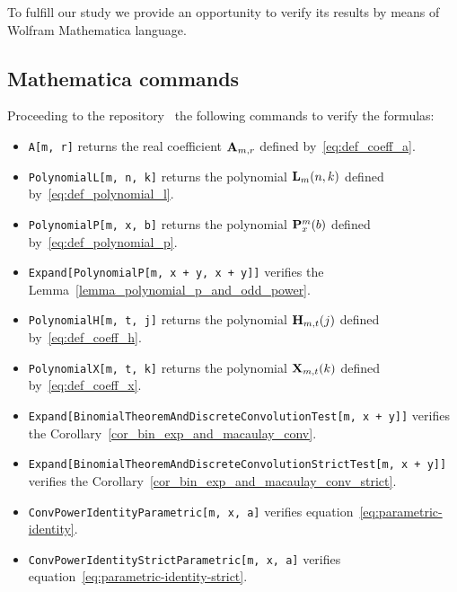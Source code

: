 To fulfill our study we provide an opportunity to verify its results by means of Wolfram Mathematica language.

\subsection{Mathematica commands} \label{subsec:mathematica-commands}
Proceeding to the repository~\cite{PK22Source} the following commands to verify the formulas:
\begin{itemize}
    \item \texttt{A[m, r]} returns the real coefficient ${\mathbf{A}} \sb{m,r}$ defined by~\eqref{eq:def_coeff_a}.
    \item \texttt{PolynomialL[m, n, k]} returns the polynomial ${\mathbf{L}}\sb{m}(n,k)$ defined by~\eqref{eq:def_polynomial_l}.
    \item \texttt{PolynomialP[m, x, b]} returns the polynomial ${\mathbf{P}}\sp{m} \sb{x}(b)$ defined by~\eqref{eq:def_polynomial_p}.
    \item \texttt{Expand[PolynomialP[m, x + y, x + y]]} verifies the Lemma~\ref{lemma_polynomial_p_and_odd_power}.
    \item \texttt{PolynomialH[m, t, j]} returns the polynomial ${\mathbf{H}} \sb{m,t} (j)$ defined by~\eqref{eq:def_coeff_h}.
    \item \texttt{PolynomialX[m, t, k]} returns the polynomial ${\mathbf{X}}\sb{m,t} (k)$ defined by~\eqref{eq:def_coeff_x}.
    \item \texttt{Expand[BinomialTheoremAndDiscreteConvolutionTest[m, x + y]]} verifies the Corollary~\ref{cor_bin_exp_and_macaulay_conv}.
    \item \texttt{Expand[BinomialTheoremAndDiscreteConvolutionStrictTest[m, x + y]]} verifies the Corollary~\ref{cor_bin_exp_and_macaulay_conv_strict}.
    \item \texttt{ConvPowerIdentityParametric[m, x, a]} verifies equation~\eqref{eq:parametric-identity}.
    \item \texttt{ConvPowerIdentityStrictParametric[m, x, a]} verifies equation~\eqref{eq:parametric-identity-strict}.
\end{itemize}


